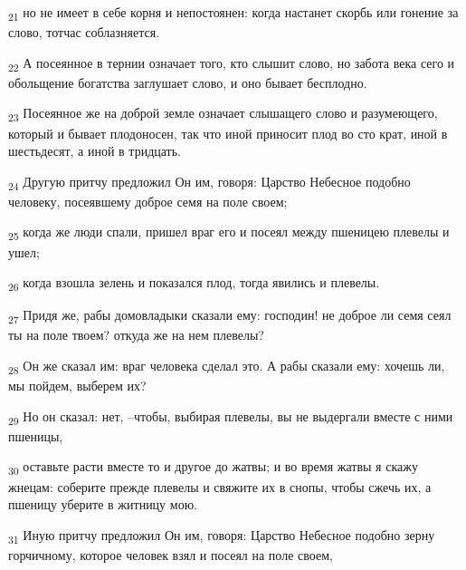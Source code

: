 \begin{tcolorbox}
\textsubscript{21} но не имеет в себе корня и непостоянен: когда настанет скорбь или гонение за слово, тотчас соблазняется.
\end{tcolorbox}
\begin{tcolorbox}
\textsubscript{22} А посеянное в тернии означает того, кто слышит слово, но забота века сего и обольщение богатства заглушает слово, и оно бывает бесплодно.
\end{tcolorbox}
\begin{tcolorbox}
\textsubscript{23} Посеянное же на доброй земле означает слышащего слово и разумеющего, который и бывает плодоносен, так что иной приносит плод во сто крат, иной в шестьдесят, а иной в тридцать.
\end{tcolorbox}
\begin{tcolorbox}
\textsubscript{24} Другую притчу предложил Он им, говоря: Царство Небесное подобно человеку, посеявшему доброе семя на поле своем;
\end{tcolorbox}
\begin{tcolorbox}
\textsubscript{25} когда же люди спали, пришел враг его и посеял между пшеницею плевелы и ушел;
\end{tcolorbox}
\begin{tcolorbox}
\textsubscript{26} когда взошла зелень и показался плод, тогда явились и плевелы.
\end{tcolorbox}
\begin{tcolorbox}
\textsubscript{27} Придя же, рабы домовладыки сказали ему: господин! не доброе ли семя сеял ты на поле твоем? откуда же на нем плевелы?
\end{tcolorbox}
\begin{tcolorbox}
\textsubscript{28} Он же сказал им: враг человека сделал это. А рабы сказали ему: хочешь ли, мы пойдем, выберем их?
\end{tcolorbox}
\begin{tcolorbox}
\textsubscript{29} Но он сказал: нет, --чтобы, выбирая плевелы, вы не выдергали вместе с ними пшеницы,
\end{tcolorbox}
\begin{tcolorbox}
\textsubscript{30} оставьте расти вместе то и другое до жатвы; и во время жатвы я скажу жнецам: соберите прежде плевелы и свяжите их в снопы, чтобы сжечь их, а пшеницу уберите в житницу мою.
\end{tcolorbox}
\begin{tcolorbox}
\textsubscript{31} Иную притчу предложил Он им, говоря: Царство Небесное подобно зерну горчичному, которое человек взял и посеял на поле своем,
\end{tcolorbox}
